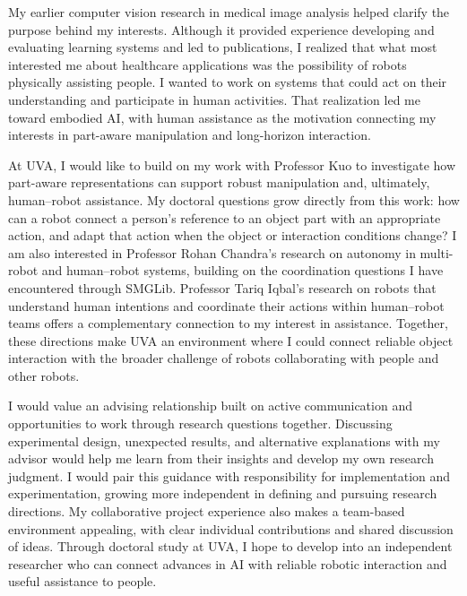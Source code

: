 \documentclass[11pt,letterpaper]{article}
\begin{document}
My earlier computer vision research in medical image analysis helped clarify the purpose behind my interests. Although it provided experience developing and evaluating learning systems and led to publications, I realized that what most interested me about healthcare applications was the possibility of robots physically assisting people. I wanted to work on systems that could act on their understanding and participate in human activities. That realization led me toward embodied AI, with human assistance as the motivation connecting my interests in part-aware manipulation and long-horizon interaction.

At UVA, I would like to build on my work with Professor Kuo to investigate how part-aware representations can support robust manipulation and, ultimately, human--robot assistance. My doctoral questions grow directly from this work: how can a robot connect a person's reference to an object part with an appropriate action, and adapt that action when the object or interaction conditions change? I am also interested in Professor Rohan Chandra's research on autonomy in multi-robot and human--robot systems, building on the coordination questions I have encountered through SMGLib. Professor Tariq Iqbal's research on robots that understand human intentions and coordinate their actions within human--robot teams offers a complementary connection to my interest in assistance. Together, these directions make UVA an environment where I could connect reliable object interaction with the broader challenge of robots collaborating with people and other robots.

I would value an advising relationship built on active communication and opportunities to work through research questions together. Discussing experimental design, unexpected results, and alternative explanations with my advisor would help me learn from their insights and develop my own research judgment. I would pair this guidance with responsibility for implementation and experimentation, growing more independent in defining and pursuing research directions. My collaborative project experience also makes a team-based environment appealing, with clear individual contributions and shared discussion of ideas. Through doctoral study at UVA, I hope to develop into an independent researcher who can connect advances in AI with reliable robotic interaction and useful assistance to people.
\end{document}
